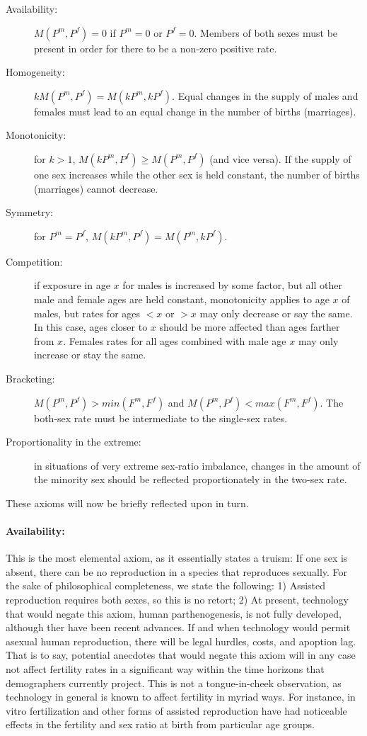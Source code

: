 \begin{description}
  \item[Availability:] $M(P^m, P^f) = 0$ if $P^m = 0$ or $P^f = 0$. Members of
  both sexes must be present in order for there to be a non-zero positive rate.
  \item[Homogeneity:] $kM(P^m, P^f) = M(kP^m, kP^f)$. Equal
  changes in the supply of males and females must lead to an equal change in the
  number of births (marriages).
  \item[Monotonicity:] for $k > 1$, $M(kP^m, P^f) \ge M(P^m, P^f)$ (and vice
  versa). If the supply of one sex increases while the other sex is held constant, the number of
  births (marriages) cannot decrease.
  \item[Symmetry:] for $P^m = P^f$, $M(kP^m, P^f) = M(P^m, kP^f)$. 
  \item[Competition:] if exposure in age $x$ for males is increased by some
  factor, but all other male and female ages are held constant, monotonicity
  applies to age $x$ of males, but rates for ages $<x$ or $>x$ may only decrease
  or say the same. In this case, ages closer to $x$ should be more affected than
  ages farther from $x$. Females rates for all ages combined with male age $x$
  may only increase or stay the same.
  \item[Bracketing:] $M(P^m, P^f) > min(F^m, F^f)$ and $M(P^m, P^f) < max(F^m,
  F^f)$. The both-sex rate must be intermediate to the single-sex rates.
  \item[Proportionality in the extreme:] in situations of very extreme sex-ratio
  imbalance, changes in the amount of the minority sex should be reflected proportionately
  in the two-sex rate.
\end{description}
 
These axioms will now be briefly reflected upon in turn.

\paragraph{Availability:} This is the most elemental axiom, as it essentially
states a truism: If one sex is absent, there can be no reproduction in a species
that reproduces sexually. For the sake of philosophical completeness, we state
the following: 1) Assisted reproduction requires both sexes, so this is no
retort; 2) At present, technology that would negate this axiom, human
parthenogenesis, is not fully developed, although ther have been recent
advances\citep{revazova2007patient}. If and when technology would permit asexual
human reproduction, there will be legal hurdles, costs, and apoption lag. 
That is to say, potential anecdotes that would negate this axiom
will in any case not affect fertility rates in a significant way within the time
horizons that demographers currently project. This is not a tongue-in-cheek
observation, as technology in general is known to affect fertility in myriad
ways. For instance, in vitro fertilization and other forms of assisted
reproduction have had noticeable effects in the fertility and sex ratio at birth from particular
age groups.

